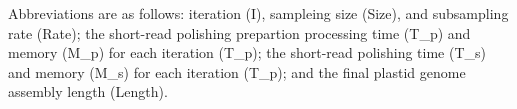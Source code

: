 \begingroup
\scriptsize
\setlength{\parskip}{2pt}

Abbreviations are as follows: iteration (I), sampleing size (Size), and subsampling rate (Rate);
the short-read polishing prepartion processing time (T_p) and memory (M_p) for each iteration (T_p);
the short-read polishing time (T_s) and memory (M_s) for each iteration (T_p); and
the final plastid genome assembly length (Length).

\endgroup

